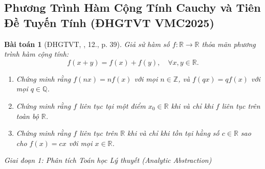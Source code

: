 \documentclass{article}
\newtheorem{baitoan}{Bài toán}
\begin{document}
\subsection{Phương Trình Hàm Cộng Tính Cauchy và Tiên Đề Tuyến Tính (ĐHGTVT VMC2025)}

\begin{baitoan}[ĐHGTVT, \cite{VMS_VMC2025}, 12., p. 39]
Giả sử hàm số $f: \mathbb{R} \to \mathbb{R}$ thỏa mãn phương trình hàm cộng tính:
\begin{equation}
    f(x + y) = f(x) + f(y), \quad \forall x, y \in \mathbb{R}.
\end{equation}
\begin{enumerate}
    \item[(a)] Chứng minh rằng $f(nx) = nf(x)$ với mọi $n \in \mathbb{Z}$, và $f(qx) = qf(x)$ với mọi $q \in \mathbb{Q}$.
    \item[(b)] Chứng minh rằng $f$ liên tục tại một điểm $x_0 \in \mathbb{R}$ khi và chỉ khi $f$ liên tục trên toàn bộ $\mathbb{R}$.
    \item[(c)] Chứng minh rằng $f$ liên tục trên $\mathbb{R}$ khi và chỉ khi tồn tại hằng số $c \in \mathbb{R}$ sao cho $f(x) = cx$ với mọi $x \in \mathbb{R}$.
\end{enumerate}
\end{baitoan}

\vspace{0.5em}\noindent\emph{Giai đoạn 1: Phân tích Toán học Lý thuyết (Analytic Abstraction)}
\end{document}
